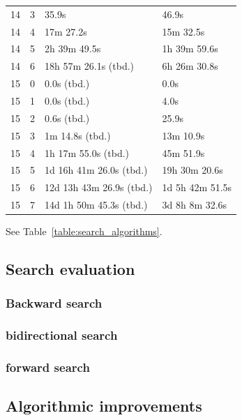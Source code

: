 \documentclass[10pt,journal,compsoc]{IEEEtran}
\begin{document}
\begin{table}[!t]
\begin{tabular}{c|c|l|l}
    14         & 3          & 35.9s                    & 46.9s                    \\
    14         & 4          & 17m 27.2s                & 15m 32.5s                \\
    14         & 5          & 2h 39m 49.5s             & 1h 39m 59.6s             \\
    14         & 6          & 18h 57m 26.1s (tbd.)     & 6h 26m 30.8s             \\
    \hline
    15         & 0          & 0.0s (tbd.)              & 0.0s                     \\
    15         & 1          & 0.0s (tbd.)              & 4.0s                     \\
    15         & 2          & 0.6s (tbd.)              & 25.9s                    \\
    15         & 3          & 1m 14.8s (tbd.)          & 13m 10.9s                \\
    15         & 4          & 1h 17m 55.0s (tbd.)      & 45m 51.9s                \\
    15         & 5          & 1d 16h 41m 26.0s (tbd.)  & 19h 30m 20.6s            \\
    15         & 6          & 12d 13h 43m 26.9s (tbd.) & 1d 5h 42m 51.5s          \\
    15         & 7          & 14d 1h 50m 45.3s (tbd.)  & 3d 8h 8m 32.6s           \\
  \end{tabular}
\end{table}

See Table~\ref{table:search_algorithms}.

\subsection{Search evaluation}

\subsubsection{Backward search}
\subsubsection{bidirectional search}
\subsubsection{forward search}


\subsection{Algorithmic improvements}
\end{document}
